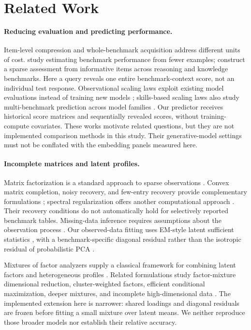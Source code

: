 \documentclass{article}
\begin{document}
\section{Related Work}
\paragraph{Reducing evaluation and predicting performance.}
Item-level compression and whole-benchmark acquisition address different units of cost. \citet{Polo2024Tiny} study estimating benchmark performance from fewer examples; \citet{Kipnis2024Meta} construct a sparse assessment from informative items across reasoning and knowledge benchmarks. Here a query reveals one entire benchmark-context score, not an individual test response. Observational scaling laws exploit existing model evaluations instead of training new models \citep{Ruan2024Scaling}; skills-based scaling laws also study multi-benchmark prediction across model families \citep{Polo2024Sloth}. Our predictor receives historical score matrices and sequentially revealed scores, without training-compute covariates. These works motivate related questions, but they are not implemented comparison methods in this study. Their generative-model settings must not be conflated with the embedding panels measured here.

\paragraph{Incomplete matrices and latent profiles.}
Matrix factorization is a standard approach to sparse observations \citep{Koren2009Factors}. Convex matrix completion, noisy recovery, and few-entry recovery provide complementary formulations \citep{Candes2009Completion,Candes2010Noisy,Keshavan2010Completion}; spectral regularization offers another computational approach \citep{Mazumder2010Spectral}. Their recovery conditions do not automatically hold for selectively reported benchmark tables. Missing-data inference requires assumptions about the observation process \citep{Rubin1976Missing}. Our observed-data fitting uses EM-style latent sufficient statistics \citep{Dempster1977EM}, with a benchmark-specific diagonal residual rather than the isotropic residual of probabilistic PCA \citep{Tipping1999PPCA}.

Mixtures of factor analyzers supply a classical framework for combining latent factors and heterogeneous profiles \citep{Ghahramani1996Mixture}. Related formulations study factor-mixture dimensional reduction, cluster-weighted factors, efficient conditional maximization, deeper mixtures, and incomplete high-dimensional data \citep{Viroli2010Mixture,Subedi2012Mixture,Zhao2008ECM,Viroli2017Deep,Wei2017Missing}. The implemented extension here is narrower: shared loadings and diagonal residuals are frozen before fitting a small mixture over latent means. We neither reproduce those broader models nor establish their relative accuracy.
\end{document}

